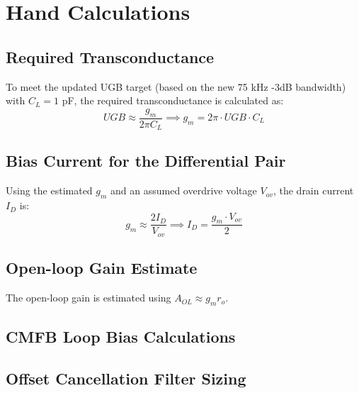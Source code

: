 \documentclass[12pt, a4paper]{article}
\begin{document}
\section{Hand Calculations}
\subsection{Required Transconductance}
To meet the updated UGB target (based on the new 75 kHz -3dB bandwidth) with $C_L = 1$ pF, the required transconductance is calculated as:
\begin{equation}
    UGB \approx \frac{g_m}{2\pi C_L} \implies g_m = 2\pi \cdot UGB \cdot C_L
\end{equation}

\subsection{Bias Current for the Differential Pair}
Using the estimated $g_m$ and an assumed overdrive voltage $V_{ov}$, the drain current $I_D$ is:
\begin{equation}
    g_m \approx \frac{2I_D}{V_{ov}} \implies I_D = \frac{g_m \cdot V_{ov}}{2}
\end{equation}

\subsection{Open-loop Gain Estimate}
The open-loop gain is estimated using $A_{OL} \approx g_m r_o$.

\subsection{CMFB Loop Bias Calculations}

\subsection{Offset Cancellation Filter Sizing}
\end{document}
